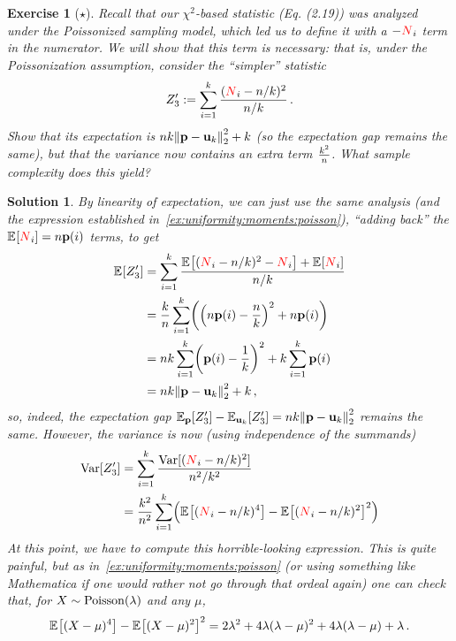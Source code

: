 \documentclass[biber,plain]{nowfnt} %
\newtheorem{question}{Exercise}[chapter]
\newtheorem{solution}{Solution}[chapter]
\newcommand{\occur}{\textcolor{red}{N}}
\newcommand{\occur}{N}
\begin{document}
\begin{question}[$\star$]
  Recall that our $\chi^2$-based statistic (Eq. (2.19)) was analyzed under the Poissonized sampling model, which led us to define it with a $-\occur_i$ term in the numerator. We will show that this term is necessary: that is, under the Poissonization assumption, consider the ``simpler'' statistic
  \[
      Z'_3 \eqdef \sum_{i=1}^\ab \frac{(\occur_i-\ns/\ab)^2}{\ns/\ab}\,.
  \]
  Show that its expectation is $\ns\ab\normtwo{\p-\uniform_\ab}^2 +\ab$ (so the expectation \emph{gap} remains the same), but that the variance now contains an extra term $\frac{k^2}{n}$. What sample complexity does this yield?
\end{question}
\begin{solution}
By linearity of expectation, we can just use the same analysis (and the expression established in~\cref{ex:uniformity:moments:poisson}), ``adding back'' the $\bEE{\occur_i} = \ns\p(i)$ terms, to get
\begin{align*}
      \bEE{Z'_3} 
      &= \sum_{i=1}^\ab \frac{\bEE{(\occur_i-\ns/\ab)^2 - \occur_i} + \bEE{\occur_i}}{\ns/\ab} \\
      &= \frac{\ab}{\ns}\sum_{i=1}^\ab \Paren{\Paren{\ns\p(i)-\frac{\ns}{\ab}}^2 + \ns\p(i)} \\
      &= \ns\ab \sum_{i=1}^\ab \Paren{\p(i)-\frac{1}{\ab}}^2 + \ab \sum_{i=1}^\ab \p(i) \\
      &= \ns\ab\normtwo{\p-\uniform_\ab}^2 +\ab\,,
\end{align*}
so, indeed, the expectation gap $\bE{\p}{Z'_3} - \bE{\uniformOn{\ab}}{Z'_3} = \ns\ab\normtwo{\p-\uniform_\ab}^2$ remains the same. However, the variance is now (using independence of the summands)
\begin{align*}
      \Var[Z'_3] 
      &= \sum_{i=1}^\ab \frac{\Var[(\occur_i-\ns/\ab)^2]}{\ns^2/\ab^2} \\
      &= \frac{\ab^2}{\ns^2}\sum_{i=1}^\ab \Paren{\bEE{(\occur_i-\ns/\ab)^4} - \bEE{(\occur_i-\ns/\ab)^2}^2}
\end{align*}
At this point, we have to compute this horrible-looking expression. This is quite painful, but as in~\cref{ex:uniformity:moments:poisson} (or using something like Mathematica if one would rather not go through that ordeal again) one can check that, for $X\sim \poisson{\lambda}$ and any $\mu$,
\begin{equation}
	\bEE{(X-\mu)^4} - \bEE{(X-\mu)^2}^2 = 2\lambda^2 + 4\lambda(\lambda-\mu)^2 + 4\lambda(\lambda-\mu) + \lambda\,. 
\end{equation}

\end{solution}
\end{document}
